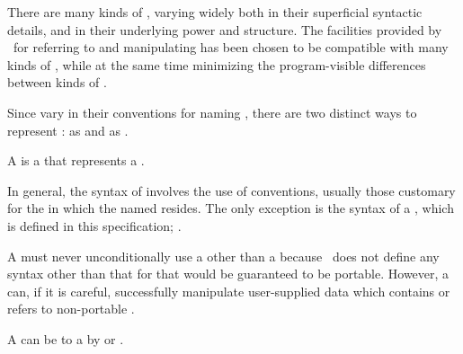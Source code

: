 
There are many kinds of ,
varying widely both in their superficial syntactic details,
		and in their underlying power and structure.
The facilities provided by \clisp\ for referring to and manipulating 
has been chosen to be compatible with many kinds of ,
while at the same time minimizing the program-visible differences 
between kinds of .

Since  vary in their conventions for naming ,
there are two distinct ways to represent :
as  and as .


A  is a  that represents a .

In general, the syntax of  involves the use of 
 conventions, 
usually those customary for the  in which the named  resides.
The only exception is the syntax of a  ,
which is defined in this specification; \seesection\LogPathNamestrings.

A  must never unconditionally use a
  other than a  
because \clisp\ does not define any  syntax 
other than that for 
that would be guaranteed to be portable.
However, a  can, if it is careful, 
successfully manipulate user-supplied data 
which contains or refers to non-portable .

A  can be  to a  by 
or .

\endSubsection%



